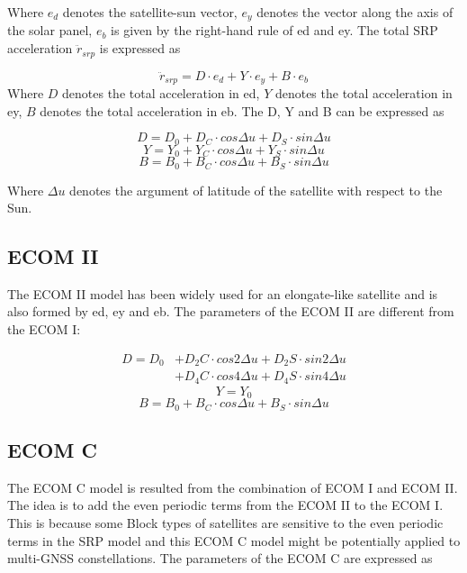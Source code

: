 Where 
$e_d$ denotes the satellite-sun vector,
$e_y$ denotes the vector along the axis of the solar panel, 
$e_b$ is given by the right-hand rule of ed and ey.
The total SRP acceleration $\ddot{r}_{srp}$ is expressed as 

\begin{equation}
\ddot{r}_{srp} = D \cdot e_d + Y \cdot e_y + B \cdot e_b
\end{equation}
Where 
$D$ denotes the total acceleration in ed,
$Y$ denotes the total acceleration in ey, 
$B$ denotes the total acceleration in eb.
The D, Y and B can be expressed as 

\begin{equation}
D = D_0 + D_C \cdot cos \Delta u + D_S \cdot sin \Delta u
\end{equation}
\begin{equation}
Y = Y_0 + Y_C \cdot cos \Delta u + Y_S \cdot sin \Delta u
\end{equation}
\begin{equation}
B = B_0 + B_C \cdot cos \Delta u + B_S \cdot sin \Delta u
\end{equation}

Where
$\Delta u$ denotes the argument of latitude of the satellite with respect to the Sun. 

\subsection{ECOM II}
The ECOM II model has been widely used for an elongate-like satellite and is also formed by ed, ey and eb. The parameters of the ECOM II are different from the ECOM I:  

\begin{equation}
\begin{split}
D = D_0 &+ D_2C \cdot cos 2\Delta u + D_2S \cdot sin 2\Delta u \\  
        &+ D_4C \cdot cos 4\Delta u + D_4S \cdot sin 4\Delta u
\end{split}
\end{equation}
\begin{equation}
Y = Y_0 
\end{equation}
\begin{equation}
B = B_0 + B_C \cdot cos \Delta u + B_S \cdot sin \Delta u
\end{equation}

\subsection{ECOM C}
The ECOM C model is resulted from the combination of ECOM I and ECOM II. The idea is to add the even periodic terms from the ECOM II to the ECOM I. This is because some Block types of satellites are sensitive to the even periodic terms in the SRP model and this ECOM C model might be potentially applied to multi-GNSS constellations. The parameters of the ECOM C are expressed as   

